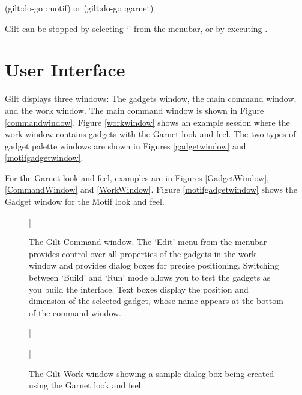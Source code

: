\begin{programexample}
(gilt:do-go :motif)
{\rm or}
(gilt:do-go :garnet)
\end{programexample}

Gilt can be stopped by selecting `' from the menubar, or by executing
.


\section{User Interface}

Gilt displays three windows: The gadgets window, the main command
window, and the work window.  The main command window is shown in Figure
\ref{commandwindow}.  Figure \ref{workwindow} shows an example session
where the work window contains gadgets with the Garnet look-and-feel.
The two types of gadget palette windows are shown in Figures
\ref{gadgetwindow} and \ref{motifgadgetwindow}.

For the Garnet look and feel, examples
are in Figures \ref{GadgetWindow}, \ref{CommandWindow} and
\ref{WorkWindow}.  Figure \ref{motifgadgetwindow} shows the Gadget
window for the Motif look and feel.

\begin{figure}
\bar{}
\begin{center}
\end{center}
\caption{The Gilt Command window.  The `Edit' menu from the menubar provides
control over all properties of the gadgets in the work window and provides
dialog boxes for precise positioning.  Switching between `Build' and
`Run' mode allows you to test the gadgets as you build the interface.
Text boxes display the position and dimension of the selected gadget,
whose name appears at the bottom of the command window.}
\end{figure}

\begin{figure}
\bar{}
\begin{center}
\end{center}
\caption{The Gilt Work window showing a sample dialog box being
created using the Garnet look and feel.}
\bar{}
\end{figure}

